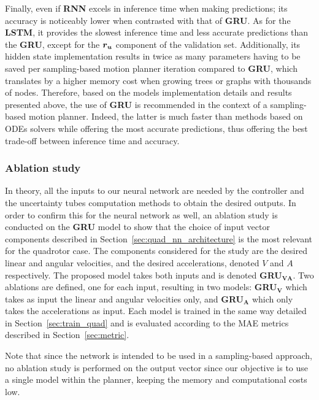 Finally, even if \textbf{RNN} excels in inference time when making predictions; its accuracy is noticeably lower when contrasted with that of \textbf{GRU}.
As for the \textbf{LSTM}, it provides the slowest inference time and less accurate predictions than the \textbf{GRU}, except for the $\boldsymbol{r_u}$ component of the validation set.
Additionally, its hidden state implementation results in twice as many parameters having to be saved per sampling-based motion planner iteration compared to \textbf{GRU}, which translates by a higher memory cost when growing trees or graphs with thousands of nodes.
Therefore, based on the models implementation details and results presented above, the use of \textbf{GRU} is recommended in the context of a sampling-based motion planner.
Indeed, the latter is much faster than methods based on ODEs solvers while offering the most accurate predictions, thus offering the best trade-off between inference time and accuracy.

\subsubsection{Ablation study}



In theory, all the inputs to our neural network are needed by the controller and the uncertainty tubes computation methods to obtain the desired outputs. 
In order to confirm this for the neural network as well, an ablation study is conducted on the \textbf{GRU} model to show that the choice of input vector components described in Section~\ref{sec:quad_nn_architecture} is the most relevant for the quadrotor case. 
The components considered for the study are the desired linear and angular velocities, and the desired accelerations, denoted $V$ and $A$ respectively. 
The proposed model takes both inputs and is denoted \textbf{GRU$\boldsymbol{_{VA}}$}. 
Two ablations are defined, one for each input, resulting in two models: \textbf{GRU$\boldsymbol{_V}$} which takes as input the linear and angular velocities only, and \textbf{GRU$\boldsymbol{_A}$} which only takes the accelerations as input. 
Each model is trained in the same way detailed in Section~\ref{sec:train_quad} and is evaluated according to the MAE metrics described in Section~\ref{sec:metric}.

Note that since the network is intended to be used in a sampling-based approach, no ablation study is performed on the output vector since our objective is to use a single model within the planner, keeping the memory and computational costs low.

